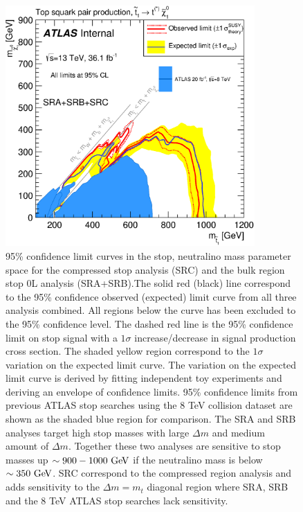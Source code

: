 \begin{figure}[h!]
	\begin{center}
		\includegraphics[width=0.85\textwidth]{figures/fit/atlascls_m0m12_wband1_showcms0_StopZL2016_SRABC_Tt_directTTplusbWN_all_Output_fixSigXSecNominal_hypotest__1_harvest_list.eps}
		\caption[95\% confidence limit curves in the stop, neutralino mass parameter space for the compressed stop analysis and the bulk region stop 0L analysis]{
		95\% confidence limit curves in the stop, neutralino mass parameter space for the compressed stop analysis (SRC) and the bulk region stop 0L analysis (SRA+SRB).The solid red (black) line correspond to the 95\% confidence observed (expected) limit curve from all three analysis combined. All regions below the curve has been excluded to the 95\% confidence level.  The dashed red line is the 95\% confidence limit on stop signal with a $1\sigma$ increase/decrease in signal production cross section.  The shaded yellow region correspond to the $1\sigma$ variation on the expected limit curve.  The variation on the expected limit curve is derived by fitting independent toy experiments and deriving an envelope of confidence limits.  95\% confidence limits from previous ATLAS stop searches using the 8 TeV collision dataset are shown as the shaded blue region for comparison.  The SRA and SRB analyses target high stop masses with large $\Delta m$ and medium amount of $\Delta m$.  Together these two analyses are sensitive to stop masses up $\sim900-1000 \gev$ if the neutralino mass is below $\sim350 \gev$. SRC correspond to the compressed region analysis and adds sensitivity to the $\Delta m = m_{t}$ diagonal region where SRA, SRB and the 8 TeV ATLAS stop searches lack sensitivity.   }
		\label{figure.exclusion.SRABC}
	\end{center}
\end{figure}

